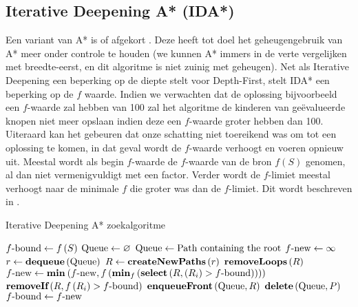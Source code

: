 \subsection{Iterative Deepening A* (IDA*)}
Een variant van A* is  of afgekort . Deze heeft tot doel het geheugengebruik van A* meer onder controle te houden (we kunnen A* immers in de verte vergelijken met breedte-eerst, en dit algoritme is niet zuinig met geheugen). Net als Iterative Deepening een beperking op de diepte stelt voor Depth-First, stelt IDA* een beperking op de $f$ waarde. Indien we verwachten dat de oplossing bijvoorbeeld een $f$-waarde zal hebben van 100 zal het algoritme de kinderen van ge\"evalueerde knopen niet meer opslaan indien deze een $f$-waarde groter hebben dan 100. Uiteraard kan het gebeuren dat onze schatting niet toereikend was om tot een oplossing te komen, in dat geval wordt de $f$-waarde verhoogt en voeren  opnieuw uit. Meestal wordt als begin $f$-waarde de $f$-waarde van de bron $f\left(S\right)$ genomen, al dan niet vermenigvuldigt met een factor. Verder wordt de $f$-limiet meestal verhoogt naar de minimale $f$ die groter was dan de $f$-limiet. Dit wordt beschreven in .
\begin{algorithm}[htb]                      %
\caption{Iterative Deepening A* zoekalgoritme}          %
\label{alg:iterativeDeepeningAStar}                           %
\begin{algorithmic}[1]                    %
\STATE $\mbox{$f$-bound}\leftarrow f\left(S\right)$
\STATE $\mbox{Queue}\leftarrow\varnothing$
\WHILE{$\neg\goalreached{\queue}$}
\STATE{}
\STATE $\mbox{Queue}\leftarrow\mbox{Path containing the root}$
\STATE $\mbox{$f$-new}\leftarrow\infty$
\WHILE{$\notempty{\queue}$}
\STATE $r\leftarrow\mbox{\bf dequeue}\left( \mbox{Queue} \right)$
\STATE $R\leftarrow\mbox{\bf createNewPaths}\left( r \right)$
\STATE $\mbox{\bf removeLoops}\left( R \right)$
\STATE $\mbox{$f$-new}\leftarrow\mbox{\bf min}_{}\left( \mbox{$f$-new},f\left(\mbox{\bf min}_{f}\left( \mbox{\bf select}\left( R,\left(R_i\right)>\mbox{$f$-bound} \right) \right)\right) \right)$
\STATE $\mbox{\bf removeIf}\left( R,f\left(R_i\right)>\mbox{$f$-bound} \right)$
\STATE{}
\STATE{}
\STATE $\mbox{\bf enqueueFront}\left( \mbox{Queue},R \right)$
\STATE{}
\STATE $\mbox{\bf delete}\left( \mbox{Queue},P \right)$
\ENDIF
\ENDWHILE
\STATE{}
\STATE $\mbox{$f$-bound}\leftarrow\mbox{$f$-new}$
\ENDWHILE
\end{algorithmic}
\end{algorithm}
